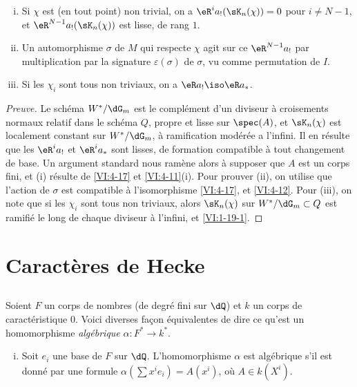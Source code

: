 \begin{proposition_}\label{VI:4-20}
\begin{enumerate}[(i)]
  \item Si $\chi$ est (en tout point) non trivial, on a 
    $\eR^i a_! (\sK_n(\chi)) = 0$ pour $i\ne N-1$, et 
    $\eR^{N-1} a_!(\sK_n(\chi))$ est lisse, de rang $1$. 
  \item Un automorphisme $\sigma$ de $M$ qui respecte $\chi$ agit sur ce 
    $\eR^{N-1} a_!$ par multiplication par la signature $\varepsilon(\sigma)$ 
    de $\sigma$, vu comme permutation de $I$. 
  \item Si les $\chi_i$ sont tous non triviaux, on a $\eR a_! \iso \eR a_\ast$. 
\end{enumerate}
\end{proposition_}
\begin{proof}[Preuve]
Le schéma $W^\ast/\dG_m$ est le complément d'un diviseur à croisements 
normaux relatif dans le schéma $Q$, propre et lisse sur $\spec(A)$, et 
$\sK_n(\chi)$ est 
localement constant sur $W^\ast/\dG_m$, à ramification 
modérée a l'infini. Il en résulte que les $\eR^i a_!$ et 
$\eR^i a_\ast$ sont lisses, de formation compatible à tout changement de 
base. Un argument standard nous ramène alors à supposer que $A$ est un 
corps fini, et (i) résulte de \ref{VI:4-17} et \ref{VI:4-11}(i). Pour 
prouver (ii), on utilise que l'action de $\sigma$ est compatible à 
l'isomorphisme \ref{VI:4-17}, et \ref{VI:4-12}. Pour (iii), on note que si les 
$\chi_i$ sont tous non triviaux, alors $\sK_n(\chi)$ sur 
$W^\ast/\dG_m\subset Q$ est ramifié le long de chaque diviseur à l'infini, 
et \ref{VI:1-19-1}. 
\end{proof}










\section{Caractères de Hecke}\label{VI:5}





\subsection{}\label{VI:5-1}

Soient $F$ un corps de nombres (de degré fini sur $\dQ$) et $k$ un corps de 
caractéristique $0$. Voici diverses façon équivalentes de dire ce qu'est un 
homomorphisme \emph{algébrique} $\alpha:F^\ast \to k^\ast$. 
\begin{enumerate}[(i)]
  \item Soit $e_i$ une base de $F$ sur $\dQ$. L'homomorphisme $\alpha$ est 
    algébrique s'il est donné par une formule 
    $\alpha(\sum x^i e_i) = A(x^i)$, où $A\in k(X^i)$. 
\end{enumerate}

